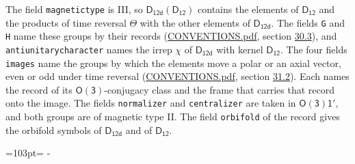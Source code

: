 \documentclass[10pt,a4paper]{article}
\newcommand{\needspace}[1]{\par\penalty-100\begingroup\dimen0=#1\relax\dimen2=\pagegoal
  \advance\dimen2-\pagetotal\ifdim\dimen0>\dimen2\relax\ifdim\dimen2>0pt\vfil\break\fi\fi
  \endgroup}
\numberwithin{equation}{section}
\newcommand{\grp}[1]{\mathsf{#1}}
\begin{document}
The field \texttt{magnetictype} is III, so $\grp{D_{12d}}(\grp{D_{12}})$ contains the elements of $\grp{D_{12}}$ and the products of time reversal $\varTheta$ with the other elements of $\grp{D_{12d}}$. The fields \texttt{G} and \texttt{H} name these groups by their records (\href{../../CONVENTIONS.pdf}{CONVENTIONS.pdf}, section \href{../../CONVENTIONS.pdf\#conv.30.3}{30.3}), and \texttt{antiunitarycharacter} names the irrep $\chi$ of $\grp{D_{12d}}$ with kernel $\grp{D_{12}}$. The four fields \texttt{images} name the groups by which the elements move a polar or an axial vector, even or odd under time reversal (\href{../../CONVENTIONS.pdf}{CONVENTIONS.pdf}, section \href{../../CONVENTIONS.pdf\#conv.31.2}{31.2}). Each names the record of its $\grp{O(3)}$-conjugacy class and the frame that carries that record onto the image. The fields \texttt{normalizer} and \texttt{centralizer} are taken in $\grp{O(3)1'}$, and both groups are of magnetic type II. The field \texttt{orbifold} of the record gives the orbifold symbols of $\grp{D_{12d}}$ and of $\grp{D_{12}}$.
\needspace{103pt}
\end{document}
